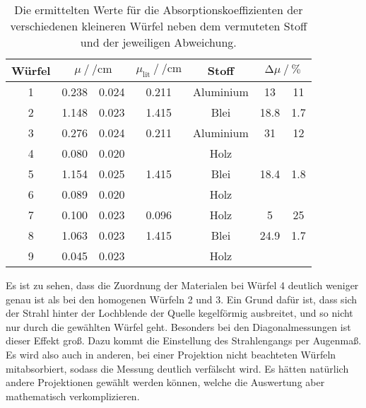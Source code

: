 \begin{table}[H]
    \centering
    \caption{Die ermittelten Werte für die Absorptionskoeffizienten der verschiedenen kleineren Würfel neben dem vermuteten Stoff und der jeweiligen Abweichung.}
    \label{tab:compare}
    \begin{tabular}{c S[table-format=1.3] @{${}\pm{}$} S[table-format=1.3] S[table-format=1.3] c S[table-format=2.1] @{${}\pm{}$} S[table-format=2.1]}
      \toprule
      {Würfel} &   & {$\mu_{\text{lit}} \mathbin{/} \si{\per\centi\metre}$} & {Stoff} &  \\
       & 0.238 & 0.024  & 0.211 & Aluminium  & 13    &11\\
      2 & 1.148 & 0.023  & 1.415 & Blei       & 18.8  & 1.7\\
      3 & 0.276 & 0.024  & 0.211 & Aluminium  & 31    &12\\
      4 & 0.080 & 0.020  &       & Holz       &       & \\
      5 & 1.154 & 0.025  & 1.415 & Blei       & 18.4  &1.8\\
      6 & 0.089 & 0.020  &       & Holz       &      &  \\
      7 & 0.100 & 0.023  & 0.096 & Holz       & 5    & 25\\
      8 & 1.063 & 0.023  & 1.415 & Blei       & 24.9  &1.7\\
      9 & 0.045 & 0.023  &       & Holz       &       &  \\
      \bottomrule
    \end{tabular}
  \end{table}

\noindent Es ist zu sehen, dass die Zuordnung der Materialen bei Würfel 4 deutlich weniger genau ist als bei den homogenen Würfeln 2 und 3. Ein Grund
dafür ist, dass sich der Strahl hinter der Lochblende der Quelle kegelförmig ausbreitet, und so nicht nur durch die gewählten Würfel geht. 
Besonders bei den Diagonalmessungen ist dieser Effekt groß. Dazu kommt die Einstellung des Strahlengangs per Augenmaß. Es wird also auch in anderen, 
bei einer Projektion nicht beachteten Würfeln mitabsorbiert, sodass die Messung deutlich verfälscht wird. Es hätten natürlich andere Projektionen gewählt 
werden können, welche die Auswertung aber mathematisch verkomplizieren. 